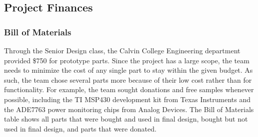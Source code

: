 \subsection{Project Finances}
\subsubsection{Bill of Materials}
Through the Senior Design class, the Calvin College Engineering department provided \$750 for prototype parts. Since the project has a large scope, the team needs to minimize the cost of any single part to stay within the given budget. As such, the team chose several parts more because of their low cost rather than for functionality. For example, the team sought donations and free samples whenever possible, including the TI MSP430 development kit from Texas Instruments and the ADE7763 power monitoring chips from Analog Devices. The Bill of Materials table shows all parts that were bought and used in final design, bought but not used in final design, and parts that were donated. 







